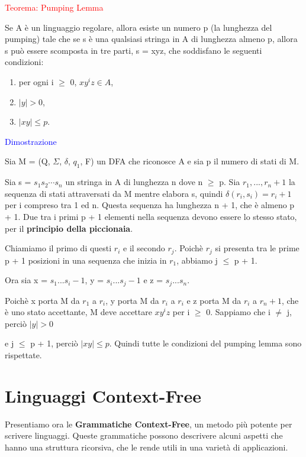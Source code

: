 \documentclass{article}
\begin{document}
\begin{center}
    \textcolor{red}{Teorema: Pumping Lemma}
\end{center}

Se A è un linguaggio regolare, allora esiste un numero p (la lunghezza del
pumping) tale che se s è una qualsiasi stringa in A di lunghezza almeno p,
allora s può essere scomposta in tre parti, s = xyz, che soddisfano le seguenti
condizioni:

\begin{enumerate}
    \item per ogni i $\geq$ 0, $xy^{i}z \in A$,
    \item $|y| > 0$,
    \item $|xy| \leq p$.
\end{enumerate}

\textcolor{blue}{Dimostrazione}

Sia M = (Q, $\Sigma$, $\delta$, $q_1$, F) un DFA che riconosce A e sia p il
numero di stati di M. 

Sia s = $s_1s_2\cdots s_n$ un stringa in A di lunghezza n dove n $\geq$ p. Sia
$r_1, ..., r_n+1$ la sequenza di stati attraversati da M mentre elabora s,
quindi $\delta(r_i,s_i) = r_i+1$ per i compreso tra 1 ed n. Questa sequenza ha
lunghezza n + 1, che è almeno p + 1. Due tra i primi p + 1 elementi nella
sequenza devono essere lo stesso stato, per il \textbf{principio della
piccionaia}. 

Chiamiamo il primo di questi $r_i$ e il secondo $r_j$. Poichè $r_j$ si presenta
tra le prime p + 1 posizioni in una sequenza che inizia in $r_1$, abbiamo j
$\leq$ p + 1. 

Ora sia x = $s_1...s_i-1$, y = $s_i...s_j-1$ e z = $s_j...s_n$.

Poichè x porta M da $r_1$ a $r_i$, y porta M da $r_i$ a $r_i$ e z porta M da
$r_i$ a $r_n+1$, che è uno stato accettante, M deve accettare $xy^iz$ per i
$\geq$ 0. Sappiamo che i $\neq$ j, perciò $|y| > 0$

e j $\leq$ p + 1, perciò $|xy| \leq p$. Quindi tutte le condizioni del pumping
lemma sono rispettate.

\section{Linguaggi Context-Free}

Presentiamo ora le \textbf{Grammatiche Context-Free}, un metodo più potente per
scrivere linguaggi. Queste grammatiche possono descrivere alcuni aspetti che
hanno una struttura ricorsiva, che le rende utili in una varietà di
applicazioni.
\end{document}
